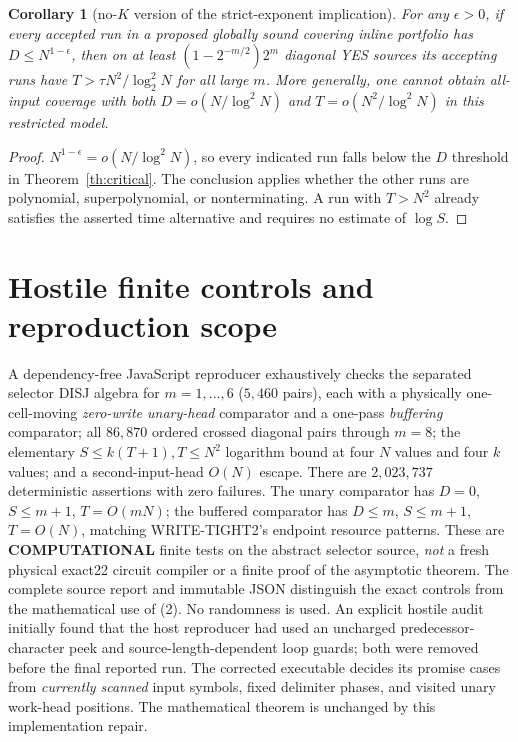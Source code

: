 \documentclass[11pt]{article}
\newtheorem{corollary}[theorem]{Corollary}
\begin{document}
\begin{corollary}[no-$K$ version of the strict-exponent implication]
\label{co:nok}
For any $\epsilon>0$, if every accepted run in a proposed
globally sound covering inline portfolio has
$D\le N^{1-\epsilon}$, then on at least
$(1-2^{-m/2})2^m$ diagonal YES sources
its accepting runs have
$T>\tau N^2/\log_2^2 N$ for all large $m$.
More generally, one cannot obtain all-input coverage with
both $D=o(N/\log^2N)$ and $T=o(N^2/\log^2N)$
in this restricted model.
\end{corollary}
\begin{proof}
$N^{1-\epsilon}=o(N/\log^2N)$, so every indicated run
falls below the $D$ threshold in Theorem~\ref{th:critical}.
The conclusion applies whether the other runs are
polynomial, superpolynomial, or nonterminating. A run
with $T>N^2$ already satisfies the asserted time
alternative and requires no estimate of $\log S$.
\end{proof}

\section{Hostile finite controls and reproduction scope}
A dependency-free JavaScript reproducer exhaustively checks the
separated selector DISJ algebra for $m=1,\ldots,6$
($5{,}460$ pairs), each with a physically
one-cell-moving \emph{zero-write unary-head} comparator
and a one-pass \emph{buffering} comparator;
all $86{,}870$ ordered crossed diagonal pairs through $m=8$;
the elementary $S\le k(T+1),T\le N^2$ logarithm bound
at four $N$ values and four $k$ values;
and a second-input-head $O(N)$ escape.
There are $2{,}023{,}737$ deterministic assertions with
zero failures. The unary comparator has $D=0$,
$S\le m+1$, $T=O(mN)$; the buffered comparator has
$D\le m$, $S\le m+1$, $T=O(N)$, matching
WRITE-TIGHT2's endpoint resource patterns.
These are \textbf{COMPUTATIONAL} finite tests on the abstract
selector source, \emph{not} a fresh physical exact22 circuit
compiler or a finite proof of the asymptotic theorem.
The complete source report and immutable JSON distinguish
the exact controls from the mathematical use of (2).
No randomness is used.
An explicit hostile audit initially found that the host reproducer
had used an uncharged predecessor-character peek and
source-length-dependent loop guards; both were removed before
the final reported run. The corrected executable decides its
promise cases from \emph{currently scanned} input symbols,
fixed delimiter phases, and visited unary work-head positions.
The mathematical theorem is unchanged by this implementation repair.
\end{document}

